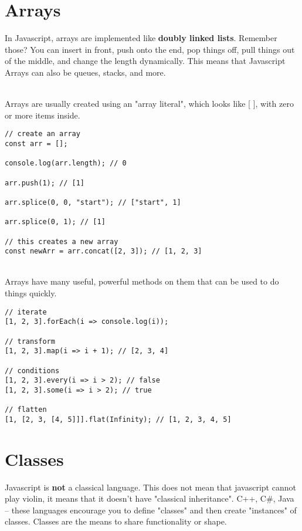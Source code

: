 \documentclass{article}
\begin{document}
\section{Arrays}

In Javascript, arrays are implemented like \textbf{doubly linked lists}. Remember those? You can insert in front, push onto the end, pop things off, pull things out of the middle, and change the length dynamically. This means that Javascript Arrays can also be queues, stacks, and more.

\noindent
\\
Arrays are usually created using an "array literal", which looks like [ ], with zero or more items inside.
\\

\begin{verbatim}
// create an array
const arr = [];

console.log(arr.length); // 0

arr.push(1); // [1]

arr.splice(0, 0, "start"); // ["start", 1]

arr.splice(0, 1); // [1]

// this creates a new array
const newArr = arr.concat([2, 3]); // [1, 2, 3]

\end{verbatim}

\noindent
\\
Arrays have many useful, powerful methods on them that can be used to do things quickly.

\begin{verbatim}
// iterate
[1, 2, 3].forEach(i => console.log(i));

// transform
[1, 2, 3].map(i => i + 1); // [2, 3, 4]

// conditions
[1, 2, 3].every(i => i > 2); // false
[1, 2, 3].some(i => i > 2); // true

// flatten
[1, [2, 3, [4, 5]]].flat(Infinity); // [1, 2, 3, 4, 5]
\end{verbatim}

\section{Classes}

Javascript is \textbf{not} a classical language. This does not mean that javascript cannot play violin, it means that it doesn't have "classical inheritance". C++, C\#, Java -- these languages encourage you to define "classes" and then create "instances" of classes. Classes are the means to share functionality or shape.
\end{document}
